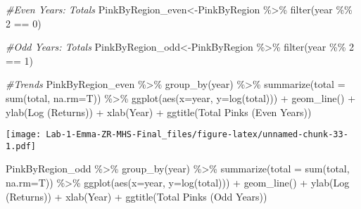 \documentclass[
]{article}
\newenvironment{Shaded}{\begin{snugshade}}{\end{snugshade}}
\newcommand{\AttributeTok}[1]{\textcolor[rgb]{0.77,0.63,0.00}{#1}}
\newcommand{\CommentTok}[1]{\textcolor[rgb]{0.56,0.35,0.01}{\textit{#1}}}
\newcommand{\DecValTok}[1]{\textcolor[rgb]{0.00,0.00,0.81}{#1}}
\newcommand{\FunctionTok}[1]{\textcolor[rgb]{0.00,0.00,0.00}{#1}}
\newcommand{\NormalTok}[1]{#1}
\newcommand{\OtherTok}[1]{\textcolor[rgb]{0.56,0.35,0.01}{#1}}
\newcommand{\SpecialCharTok}[1]{\textcolor[rgb]{0.00,0.00,0.00}{#1}}
\newcommand{\StringTok}[1]{\textcolor[rgb]{0.31,0.60,0.02}{#1}}
\begin{document}
\begin{Shaded}
\begin{Highlighting}[]
\CommentTok{\#Even Years: Totals }
\NormalTok{PinkByRegion\_even}\OtherTok{\textless{}{-}}\NormalTok{PinkByRegion }\SpecialCharTok{\%\textgreater{}\%} 
  \FunctionTok{filter}\NormalTok{(year }\SpecialCharTok{\%\%} \DecValTok{2} \SpecialCharTok{==} \DecValTok{0}\NormalTok{)}

\CommentTok{\#Odd Years: Totals }
\NormalTok{PinkByRegion\_odd}\OtherTok{\textless{}{-}}\NormalTok{PinkByRegion }\SpecialCharTok{\%\textgreater{}\%} 
  \FunctionTok{filter}\NormalTok{(year }\SpecialCharTok{\%\%} \DecValTok{2} \SpecialCharTok{==} \DecValTok{1}\NormalTok{)}

\CommentTok{\#Trends}
\NormalTok{PinkByRegion\_even }\SpecialCharTok{\%\textgreater{}\%}
  \FunctionTok{group\_by}\NormalTok{(year) }\SpecialCharTok{\%\textgreater{}\%}
  \FunctionTok{summarize}\NormalTok{(}\AttributeTok{total =} \FunctionTok{sum}\NormalTok{(total, }\AttributeTok{na.rm=}\NormalTok{T)) }\SpecialCharTok{\%\textgreater{}\%}
  \FunctionTok{ggplot}\NormalTok{(}\FunctionTok{aes}\NormalTok{(}\AttributeTok{x=}\NormalTok{year, }\AttributeTok{y=}\FunctionTok{log}\NormalTok{(total))) }\SpecialCharTok{+}
  \FunctionTok{geom\_line}\NormalTok{() }\SpecialCharTok{+}
  \FunctionTok{ylab}\NormalTok{(}\StringTok{\textquotesingle{}Log (Returns)\textquotesingle{}}\NormalTok{) }\SpecialCharTok{+}
  \FunctionTok{xlab}\NormalTok{(}\StringTok{\textquotesingle{}Year\textquotesingle{}}\NormalTok{) }\SpecialCharTok{+}
  \FunctionTok{ggtitle}\NormalTok{(}\StringTok{\textquotesingle{}Total Pinks (Even Years)\textquotesingle{}}\NormalTok{)}
\end{Highlighting}
\end{Shaded}

\texttt{[image: Lab-1-Emma-ZR-MHS-Final\_files/figure-latex/unnamed-chunk-33-1.pdf]}

\begin{Shaded}
\begin{Highlighting}[]
\NormalTok{PinkByRegion\_odd }\SpecialCharTok{\%\textgreater{}\%}
  \FunctionTok{group\_by}\NormalTok{(year) }\SpecialCharTok{\%\textgreater{}\%}
  \FunctionTok{summarize}\NormalTok{(}\AttributeTok{total =} \FunctionTok{sum}\NormalTok{(total, }\AttributeTok{na.rm=}\NormalTok{T)) }\SpecialCharTok{\%\textgreater{}\%}
  \FunctionTok{ggplot}\NormalTok{(}\FunctionTok{aes}\NormalTok{(}\AttributeTok{x=}\NormalTok{year, }\AttributeTok{y=}\FunctionTok{log}\NormalTok{(total))) }\SpecialCharTok{+}
  \FunctionTok{geom\_line}\NormalTok{() }\SpecialCharTok{+}
  \FunctionTok{ylab}\NormalTok{(}\StringTok{\textquotesingle{}Log (Returns)\textquotesingle{}}\NormalTok{) }\SpecialCharTok{+}
  \FunctionTok{xlab}\NormalTok{(}\StringTok{\textquotesingle{}Year\textquotesingle{}}\NormalTok{) }\SpecialCharTok{+}
  \FunctionTok{ggtitle}\NormalTok{(}\StringTok{\textquotesingle{}Total Pinks (Odd Years)\textquotesingle{}}\NormalTok{)}
\end{Highlighting}
\end{Shaded}
\end{document}

